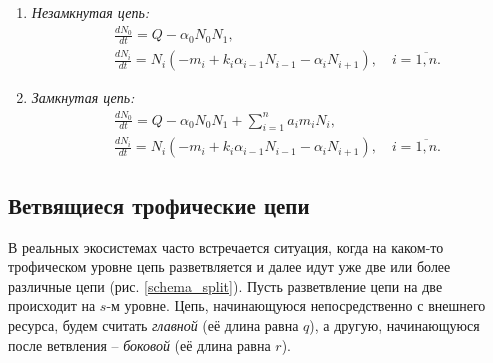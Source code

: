 \begin{enumerate}[label={\asbuk*)}, ref=\asbuk*]
    \item \textit{Незамкнутая цепь:}
    \begin{equation}  \label{flow}
        \begin{split}
            & \frac{dN_0}{dt} = Q - \alpha_0 N_0 N_1, \\
            & \frac{dN_i}{dt} = N_i (-m_i + k_i \alpha_{i-1} N_{i-1}  - \alpha_i N_{i+1}), \quad i=\overline{1,n}.
        \end{split}
    \end{equation}

    \item \textit{Замкнутая цепь:}
    \begin{equation} \label{cycle}
        \begin{split}
            & \frac{dN_0}{dt} = Q - \alpha_0 N_0 N_1  + \sum_{i=1}^{n} a_i m_i N_i, \\
            & \frac{dN_i}{dt} = N_i (-m_i + k_i \alpha_{i-1} N_{i-1}  - \alpha_i N_{i+1}), \quad i=\overline{1,n}.
        \end{split}
    \end{equation}
\end{enumerate}


\subsection{Ветвящиеся трофические цепи}
В реальных экосистемах часто встречается ситуация, когда на каком-то трофическом уровне цепь разветвляется и далее идут уже две или более различные цепи (рис. \ref{schema_split}). Пусть разветвление цепи на две происходит на \(s\)-м уровне. Цепь, начинающуюся непосредственно с внешнего ресурса, будем считать \textit{главной} (её длина равна \(q\)), а другую, начинающуюся после ветвления -- \textit{боковой} (её длина равна \(r\)).



